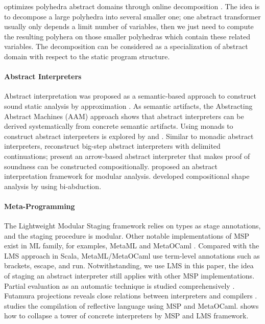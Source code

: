 \citeauthor{DBLP:conf/popl/SinghPV17} optimizes polyhedra abstract domains
through online decomposition \cite{DBLP:conf/popl/SinghPV17,
Singh:2017:PCD:3177123.3158143}. The idea is to decompose a large polyhedra into
several smaller one; one abstract transformer usually only depends a limit
number of variables, then we just need to compute the resulting polyhera on
those smaller polyhedras which contain these related variables. The decomposition
can be considered as a specialization of abstract domain with respect to the
static program structure.

\paragraph{Abstract Interpreters} Abstract interpretation was proposed as a
semantic-based approach to construct sound static analysis by approximation
\cite{DBLP:conf/popl/CousotC77}. As semantic artifacts, the Abstracting Abstract
Machines (AAM) \cite{DBLP:journals/jfp/HornM12, DBLP:conf/icfp/HornM10} approach
shows that abstract interpreters can be derived systematically from concrete
semantic artifacts.
Using monads to construct abstract interpreters is explored by
\citet{Sergey:2013:MAI:2491956.2491979} and
\citet{DBLP:journals/pacmpl/DaraisLNH17}.
Similar to monadic abstract interpreters, \citet{Wei:2018:RAA:3243631.3236800}
reconstruct big-step abstract interpreters with delimited continuations;
\citet{Keidel:2018:CSP:3243631.3236767} present an arrow-based abstract
interpreter that makes proof of soundness can be constructed compositionally.
\cite{DBLP:conf/cc/CousotC02} proposed an
abstract interpretation framework for modular analysis.
\citet{DBLP:conf/popl/CalcagnoDOY09} developed compositional shape analysis by
using bi-abduction.

\paragraph{Meta-Programming} The Lightweight Modular Staging framework relies on
types as stage annotations, and the staging procedure is modular. Other notable
implementations of MSP exist in ML family, for examples, MetaML
\cite{DBLP:conf/pepm/TahaS97} and MetaOCaml \cite{DBLP:conf/gpce/CalcagnoTHL03,
DBLP:conf/flops/Kiselyov14}. Compared with the LMS approach in Scala,
MetaML/MetaOCaml use term-level annotations such as brackets, escape, and run.
Notwithstanding, we use LMS in this paper, the idea of staging an abstract
interpreter still applies with other MSP implementations. Partial evaluation as
an automatic technique is studied comprehensively
\cite{10.1007/3-540-61580-6_11, DBLP:books/daglib/0072559}. Futamura projections
reveals close relations between interpreters and compilers \cite{Futamura1999,
futamura1971partial}. \citet{DBLP:conf/gpce/Asai14} studies the compilation of
reflective language using MSP and MetaOCaml.
\citeauthor{Amin:2017:CTI:3177123.3158140} shows how to collapse a tower of
concrete interpreters by MSP and LMS framework.

